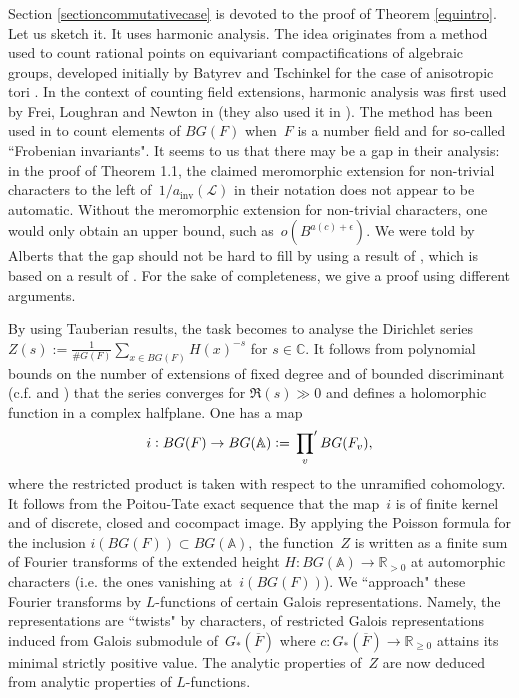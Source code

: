 \documentclass[a4paper,english,12pt]{amsart}
\newcommand{\RR}{\mathbb{R}}
\newcommand{\CC}{\mathbb{C}}
\newcommand{\oF}{\overline F}
\newcommand{\AAA}{\mathbb A}
\DeclareMathOperator{\inv}{inv}
\numberwithin{equation}{subsection}
\begin{document}
\subsubsection{} \label{detailscommutative} Section \ref{sectioncommutativecase} is devoted to the proof of Theorem \ref{equintro}. Let us sketch it. It uses harmonic analysis. The idea originates from a method used to count rational points on equivariant compactifications of algebraic groups, developed initially by Batyrev and Tschinkel for the case of anisotropic tori \cite{aniso}. In the context of counting field extensions, harmonic analysis was first used by Frei, Loughran and Newton in \cite{hassenormprin} (they also used it in \cite{prescnorms}). The method has been used in \cite{odorney} to count elements of $BG(F)$ when~$F$ is a number field and for so-called ``Frobenian invariants". It seems to us that there may be a gap in their analysis: in the proof of Theorem 1.1, the claimed meromorphic extension for non-trivial characters to the left of~$1/a_{\inv}(\mathcal L)$ in their notation does not appear to be automatic.  Without the meromorphic extension for non-trivial characters, one would only obtain an upper bound, such as~$o(B^{a(c)+\epsilon})$. We were told by Alberts that the gap should not be hard to fill by using a result of \cite{statfirstg}, which is based on a result of \cite{prescnorms}. For the sake of completeness, we give a proof using different arguments.

By using Tauberian results, the task becomes to analyse the Dirichlet series $Z(s):=\frac{1}{\# G(F)}\sum_{x\in BG(F)} H(x)^{-s}$ for $s\in\CC$. It follows from polynomial bounds on the number of extensions of fixed degree and of bounded discriminant (c.f. \cite{SchmidtNF} and \cite[Lemma 2.4]{Gmethodant}) that the series converges for $\Re(s)\gg 0$ and defines a holomorphic function in a complex halfplane.  One has a map $$i:BG(F)\to BG(\AAA):=\sideset{}{'}\prod_vBG(F_v),$$ where the restricted product is taken with respect to the unramified cohomology. It follows from the Poitou-Tate exact sequence that the map~$i$ is of finite kernel and of discrete, closed and cocompact image.  By applying the Poisson formula for the inclusion $i(BG(F))\subset BG(\AAA),$ the function~$Z$ is written as a finite sum of Fourier transforms of the extended height $H:BG(\AAA)\to\RR_{>0}$ at automorphic characters (i.e. the ones vanishing at~$i(BG(F))$).   %
We ``approach" these Fourier transforms by $L$-functions of certain Galois representations. Namely, the representations are ``twists" by characters, of  restricted Galois representations induced from Galois submodule of~$G_*(\oF)$ where $c:G_*(\oF)\to\RR_{\geq 0}$ attains its minimal strictly positive value. The analytic properties of~$Z$ are now deduced from analytic properties of $L$-functions. 
%
\end{document}
